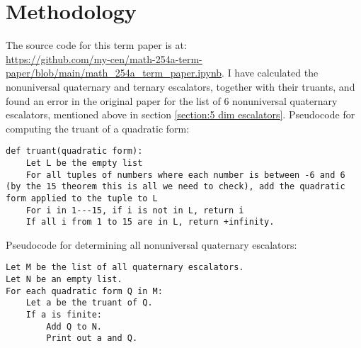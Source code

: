 \documentclass[letterpaper, 12pt]{article}
\begin{document}
\section{Methodology}
The source code for this term paper is at:\\\url{https://github.com/my-cen/math-254a-term-paper/blob/main/math_254a_term_paper.ipynb}.
I have calculated the nonuniversal quaternary and ternary escalators, together with their truants, and found an error in the original paper for the list of $6$ nonuniversal quaternary escalators, mentioned above in section \ref{section:5 dim escalators}. Pseudocode for computing the truant of a quadratic form:
\begin{verbatim}
def truant(quadratic form):
    Let L be the empty list
    For all tuples of numbers where each number is between -6 and 6 (by the 15 theorem this is all we need to check), add the quadratic form applied to the tuple to L
    For i in 1---15, if i is not in L, return i
    If all i from 1 to 15 are in L, return +infinity.
\end{verbatim}

Pseudocode for determining all nonuniversal quaternary escalators:
\begin{verbatim}
Let M be the list of all quaternary escalators.
Let N be an empty list.
For each quadratic form Q in M:
    Let a be the truant of Q.
    If a is finite:
        Add Q to N.
        Print out a and Q.
\end{verbatim}

\printbibliography
\end{document}
